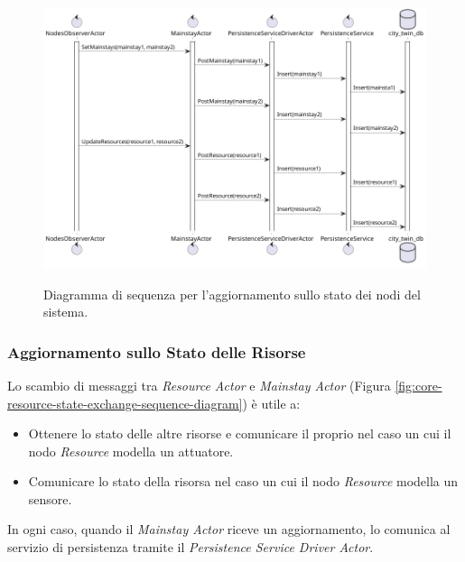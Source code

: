 \documentclass{scrartcl}
\begin{document}
\begin{figure}[H]
    \caption{Diagramma di sequenza per l'aggiornamento sullo stato dei nodi del sistema.}
    \includegraphics[width=\textwidth]{../assets/images/core-nodes-state-sequence-diagram.png}
    \label{fig:core-nodes-state-sequence-diagram}
\end{figure}

\subsubsection{Aggiornamento sullo Stato delle Risorse}

Lo scambio di messaggi tra \textit{Resource Actor} e \textit{Mainstay Actor} (Figura \ref{fig:core-resource-state-exchange-sequence-diagram}) è utile a:
\begin{itemize}
    \item Ottenere lo stato delle altre risorse e comunicare il proprio nel caso un cui il nodo \textit{Resource} modella un attuatore.
    \item Comunicare lo stato della risorsa nel caso un cui il nodo \textit{Resource} modella un sensore.
\end{itemize}

In ogni caso, quando il \textit{Mainstay Actor} riceve un aggiornamento, lo comunica al servizio di persistenza tramite il \textit{Persistence Service Driver Actor}.
\end{document}
